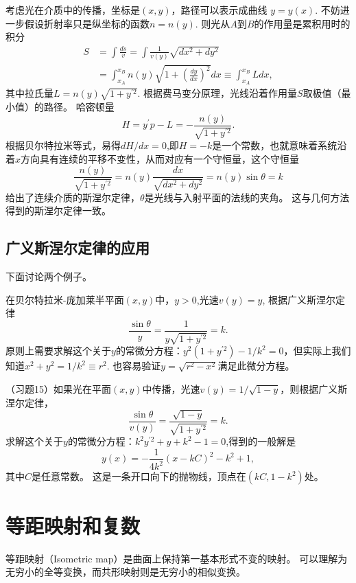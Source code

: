 \documentclass{article}
\begin{document}
考虑光在介质中的传播，坐标是$(x, y)$，路径可以表示成曲线 $y=y(x)$.
不妨进一步假设折射率只是纵坐标的函数$n=n(y)$.
则光从$A$到$B$的作用量是累积用时的积分
\begin{equation}
\begin{aligned}
S
&=\int\frac{ds}{v}
=\int\frac{1}{v(y)}\sqrt{dx^{2}+dy^{2}} \\
&=\int_{x_{A}}^{x_{B}}n(y)\sqrt{1+\left(\frac{dy}{dx}\right)^{2}}dx
\equiv\int_{x_{A}}^{x_{B}}Ldx,
\end{aligned}
\end{equation}
其中拉氏量$L=n(y)\sqrt{1+y^{\prime{2}}}$.
根据费马变分原理，光线沿着作用量$S$取极值（最小值）的路径。
哈密顿量
\begin{equation}
    H
    =y^{\prime}p-L
    =-\frac{n(y)}{\sqrt{1+y^{\prime{2}}}}.
\end{equation}
根据贝尔特拉米等式，易得$dH/dx=0$,即$H=-k$是一个常数，也就意味着系统沿着$x$方向具有连续的平移不变性，从而对应有一个守恒量，这个守恒量
\begin{equation}
    \frac{n(y)}{\sqrt{1+y^{\prime{2}}}}
    =n(y)\frac{dx}{\sqrt{dx^{2}+dy^{2}}}
    =n(y)\sin\theta=k
\end{equation}
给出了连续介质的斯涅尔定律，$\theta$是光线与入射平面的法线的夹角。
这与几何方法得到的斯涅尔定律一致。

\subsection{广义斯涅尔定律的应用}

下面讨论两个例子。

在贝尔特拉米-庞加莱半平面$(x, y)$中，$y>0$,光速$v(y)=y$,
根据广义斯涅尔定律
\begin{equation*}
    \frac{\sin\theta}{y}
    =\frac{1}{y\sqrt{1+y^{\prime{2}}}}=k.
\end{equation*}
原则上需要求解这个关于$y$的常微分方程：$y^{2}(1+y^{\prime{2}})-1/k^{2}=0$，但实际上我们知道$x^{2}+y^{2}=1/k^{2}\equiv{r^{2}}$.
也容易验证$y=\sqrt{r^{2}-x^{2}}$满足此微分方程。

（习题15）如果光在平面$(x, y)$中传播，光速$v(y)=1/\sqrt{1-y}$，则根据广义斯涅尔定律，
\begin{equation*}
    \frac{\sin\theta}{v(y)}
    =\frac{\sqrt{1-y}}{\sqrt{1+y^{\prime{2}}}}=k.
\end{equation*}
求解这个关于$y$的常微分方程：$k^{2}y^{\prime{2}}+y+k^{2}-1=0$,得到的一般解是
\begin{equation*}
    y(x)
    =-\frac{1}{4k^{2}}\left(x-kC\right)^{2}-k^{2}+1,
\end{equation*}
其中$C$是任意常数。
这是一条开口向下的抛物线，顶点在$\left(kC, 1-k^{2}\right)$处。

\section{等距映射和复数}

等距映射（Isometric map）是曲面上保持第一基本形式不变的映射。
可以理解为无穷小的全等变换，而共形映射则是无穷小的相似变换。

%
%
\end{document}
